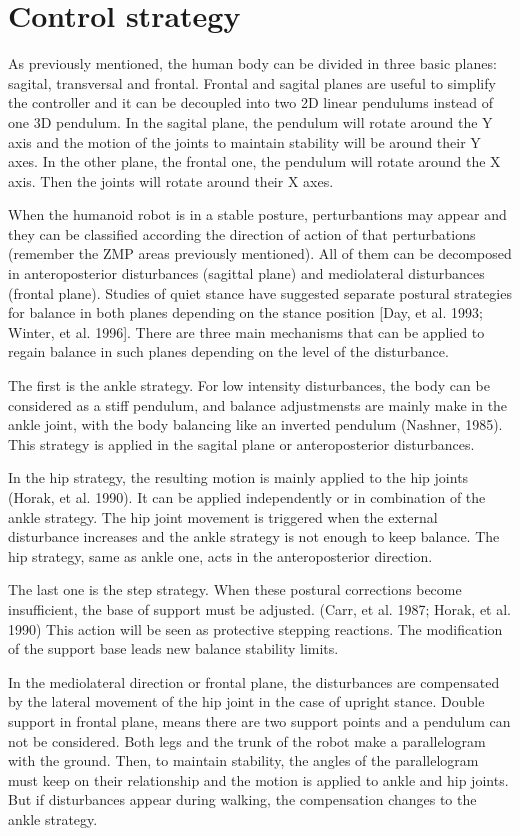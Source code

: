 




\section{Control strategy}
As previously mentioned, the human body can be divided in three basic planes: sagital, transversal and frontal. Frontal and sagital planes are useful to simplify the controller and it can be decoupled into two 2D linear pendulums instead of one 3D pendulum. In the sagital plane, the pendulum will rotate around the Y axis and the motion of the joints to maintain stability will be around their Y axes. In the other plane, the frontal one, the pendulum will rotate around the X axis.  Then the joints will rotate around their X axes.

When the humanoid robot is in a stable posture, perturbantions may appear and they can be classified according the direction of action of that perturbations (remember the ZMP areas previously mentioned). All of them can be decomposed in anteroposterior disturbances (sagittal plane) and mediolateral disturbances (frontal plane). Studies of quiet stance have suggested separate postural strategies for balance in both planes depending on the stance position [Day, et al. 1993; Winter, et al. 1996]. There are three main mechanisms that can be applied to regain balance in such planes depending on the level of the disturbance.

The first is the ankle strategy. For low intensity disturbances, the body can be considered as a stiff pendulum, and balance adjustmensts are mainly make in the ankle joint, with the body balancing like an inverted pendulum (Nashner, 1985). This strategy is applied in the sagital plane or anteroposterior disturbances.

In the hip strategy, the resulting motion is mainly applied to the hip joints (Horak, et al. 1990). It can be applied independently or in combination of the ankle strategy. The hip joint movement is triggered when the external disturbance increases and the ankle strategy is not enough to keep balance. The hip strategy, same as ankle one, acts in the anteroposterior direction.

The last one is the step strategy. When these postural corrections become insufficient, the base of support must be adjusted. (Carr, et al. 1987; Horak, et al. 1990) This action will be seen as protective stepping reactions. The modification of the support base leads new balance stability limits.

In the mediolateral direction or frontal plane, the disturbances are compensated by the lateral movement of the hip joint in the case of upright stance. Double support in frontal plane, means there are two support points and a pendulum can not be considered. Both legs and the trunk of the robot make a parallelogram with the ground. Then, to maintain stability, the angles of the parallelogram must keep on their relationship and the motion is applied to ankle and hip joints. But if disturbances appear during walking, the compensation changes to the ankle strategy.
